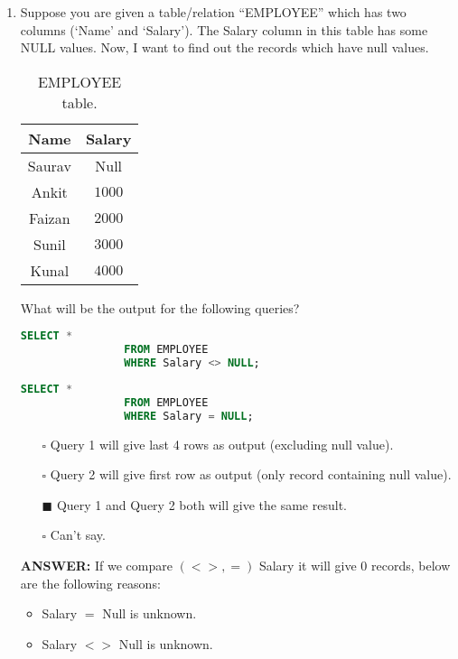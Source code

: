 \documentclass[10pt]{article}
\newcommand{\lightrule}{%
	\arrayrulecolor{black!30}%
	\midrule[\lightrulewidth]%
	\arrayrulecolor{black}}
\begin{document}
\begin{enumerate}
		\newpage

		\item Suppose you are given a table/relation “EMPLOYEE” which has two columns (‘Name’ and ‘Salary’). The Salary column in this table has some NULL values. Now, I want to find out the records which have null values.
			\begin{table}[H]
				\centering
				\begin{tabular}{@{} *{2}{c} @{}}
					\toprule
						\textbf{Name} & \textbf{Salary} \\
					\midrule
						Saurav & Null \\ 
					\lightrule
						Ankit & $1000$ \\  
					\lightrule
						Faizan & $2000$ \\
					\lightrule 
						Sunil & $3000$ \\ 
					\lightrule 
						Kunal & $4000$ \\ 
					\bottomrule
				\end{tabular}
				\caption{EMPLOYEE table.}
			\end{table}

			What will be the output for the following queries?
			\begin{lstlisting}[language=SQL,firstline=1, lastline=3] 
				SELECT * 
				FROM EMPLOYEE 
				WHERE Salary <> NULL;
			\end{lstlisting}
			\begin{lstlisting}[language=SQL,firstline=1, lastline=3] 
				SELECT * 
				FROM EMPLOYEE 
				WHERE Salary = NULL;
			\end{lstlisting}

			\begin{enumerate}
				\item[$\square$] Query 1 will give last 4 rows as output (excluding null value).
				\item[$\square$] Query 2 will give first row as output (only record containing null value).
				\item[$\blacksquare$] Query 1 and Query 2 both will give the same result.
				\item[$\square$] Can’t say.
			\end{enumerate}
			\color{red} \textbf{ANSWER:} \color{black} If we compare $(<>, =)$ Salary it will give 0 records, below are the following reasons:
			\begin{itemize}
				\item Salary $=$ Null is unknown.
				\item Salary $<>$ Null is unknown.
			\end{itemize}


\end{enumerate}
\end{document}
